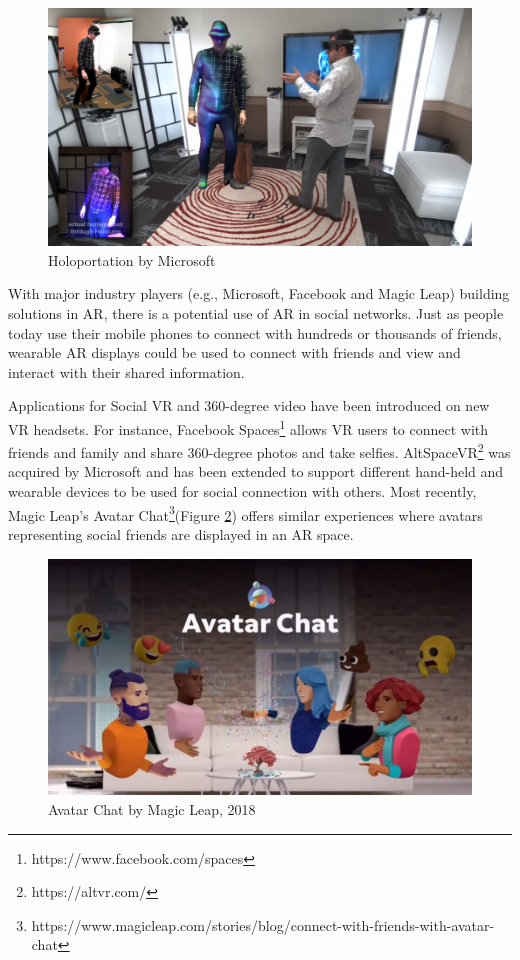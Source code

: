 \begin{figure}
    \centering
    \includegraphics[width=0.8\linewidth]{images/10-intro/holoportation.png}
    \caption{Holoportation by Microsoft \cite{Fanello2016}}
    \label{fig:holoportation}
\end{figure}


With major industry players (e.g., Microsoft, Facebook and Magic Leap) building solutions in AR, there is a potential use of AR in social networks. Just as people today use their mobile phones to connect with hundreds or thousands of friends, wearable AR displays could be used to connect with friends and view and interact with their shared information.

Applications for Social VR and 360-degree video have been introduced on new VR headsets. For instance, Facebook Spaces\footnote{https://www.facebook.com/spaces} allows VR users to connect with friends and family and share 360-degree photos and take selfies. AltSpaceVR\footnote{https://altvr.com/} was acquired by Microsoft and has been extended to support different hand-held and wearable devices to be used for social connection with others. Most recently, Magic Leap's Avatar Chat\footnote{https://www.magicleap.com/stories/blog/connect-with-friends-with-avatar-chat}(Figure \ref{fig:ml-avatar-chat-1}) offers similar experiences where avatars representing social friends are displayed in an AR space. 

\begin{figure}
    \centering
    \includegraphics[width=0.8\linewidth]{images/10-intro/magic-leap-avatar-chat.jpg}
    \caption{Avatar Chat by Magic Leap, 2018}
    \label{fig:ml-avatar-chat-1}
\end{figure}

